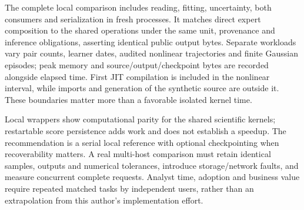 The complete local comparison includes reading, fitting, uncertainty, both
consumers and serialization in fresh processes. It matches direct expert
composition to the shared operations under the same unit, provenance and
inference obligations, asserting identical public output bytes. Separate
workloads vary pair counts, learner dates, audited nonlinear trajectories and
finite Gaussian episodes; peak memory and source/output/checkpoint bytes are
recorded alongside elapsed time. First JIT compilation is included in the
nonlinear interval, while imports and generation of the synthetic source are
outside it. These boundaries matter more than a favorable isolated kernel time.

Local wrappers show computational parity for the shared scientific kernels;
restartable score persistence adds work and does not establish a speedup.
The recommendation is a serial local reference with optional checkpointing
when recoverability matters. A real multi-host comparison must retain identical
samples, outputs and numerical tolerances, introduce storage/network faults,
and measure concurrent complete requests. Analyst time, adoption and business
value require repeated matched tasks by independent users, rather than an
extrapolation from this author's implementation effort.
